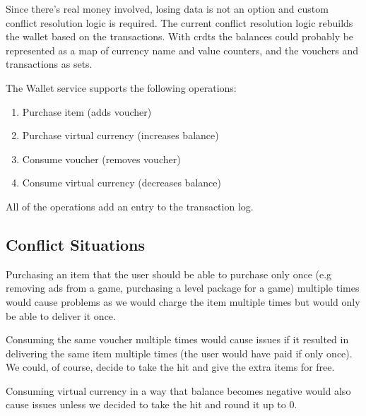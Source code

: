 \documentclass[11pt,a4paper]{report}
\begin{document}
Since there's real money involved, losing data is not an option and custom conflict resolution logic is required. The current conflict resolution logic rebuilds the wallet based on the transactions. With \glspl{crdt} the balances could probably be represented as a map of currency name and value counters, and the vouchers and transactions as sets.

The Wallet service supports the following operations:
\begin{enumerate}
\item Purchase item (adds voucher)
\item Purchase virtual currency (increases balance)
\item Consume voucher (removes voucher)
\item Consume virtual currency (decreases balance)
\end{enumerate}
All of the operations add an entry to the transaction log.

\subsection{Conflict Situations}
Purchasing an item that the user should be able to purchase only once (e.g removing ads from a game, purchasing a level package for a game) multiple times would cause problems as we would charge the item multiple times but would only be able to deliver it once.

Consuming the same voucher multiple times would cause issues if it resulted in delivering the same item multiple times (the user would have paid if only once). We could, of course, decide to take the hit and give the extra items for free.

Consuming virtual currency in a way that balance becomes negative would also cause issues unless we decided to take the hit and round it up to 0.
\end{document}
